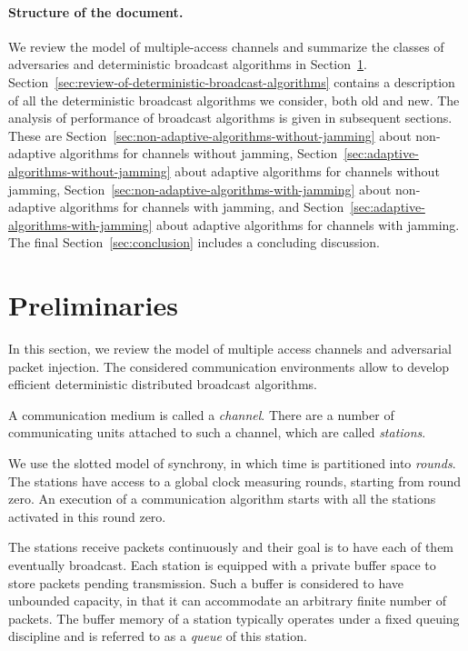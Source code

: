\documentclass[11pt]{article}
\newcommand{\BBB}{\vspace*{-\bigskipamount}}
\newcommand{\Paragraph}[1]{\BBB\paragraph{#1}}
\begin{document}
\Paragraph{Structure of the document.}


We review the model of multiple-access channels and summarize the classes of adversaries and deterministic broadcast algorithms in Section~\ref{sec:preliminaries}.
Section~\ref{sec:review-of-deterministic-broadcast-algorithms} contains a description of all the deterministic broadcast algorithms we consider, both old and new.
The analysis of performance of  broadcast algorithms is given in subsequent sections.
These are Section~\ref{sec:non-adaptive-algorithms-without-jamming} about non-adaptive algorithms for channels without jamming, Section~\ref{sec:adaptive-algorithms-without-jamming} about adaptive algorithms for channels without jamming, Section~\ref{sec:non-adaptive-algorithms-with-jamming} about non-adaptive algorithms for channels with jamming, and Section~\ref{sec:adaptive-algorithms-with-jamming} about adaptive algorithms for channels with jamming.
The final Section~\ref{sec:conclusion} includes a concluding discussion.



\section{Preliminaries}

\label{sec:preliminaries}



In this section, we review the model of multiple access channels and adversarial packet injection.
The considered communication environments allow to develop efficient deterministic distributed broadcast  algorithms. 


A communication medium is called a \emph{channel}.
There are a number of communicating units attached to such a channel, which are called \emph{stations}.

We use the slotted model of synchrony, in which time is partitioned into \emph{rounds}.
The stations have access to a global clock measuring rounds, starting from round zero.
An execution of a communication algorithm starts with all the stations activated in this round zero.

The stations receive packets continuously and their goal is to have each of them eventually broadcast.
Each station is equipped with a private buffer space to store packets pending transmission.
Such a buffer is considered to have unbounded capacity, in that it can accommodate an arbitrary finite number of packets. 
The buffer memory of a station typically operates under a fixed queuing discipline and is referred to as a \emph{queue} of this station. 
\end{document}
